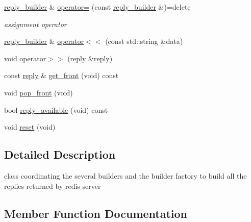 \begin{DoxyCompactItemize}
\mbox{\label{classcpp__redis_1_1builders_1_1reply__builder_a445ca388e241fe95b522890fee8c14ca}} 
\mbox{\hyperlink{classcpp__redis_1_1builders_1_1reply__builder}{reply\+\_\+builder}} \& \mbox{\hyperlink{classcpp__redis_1_1builders_1_1reply__builder_a445ca388e241fe95b522890fee8c14ca}{operator=}} (const \mbox{\hyperlink{classcpp__redis_1_1builders_1_1reply__builder}{reply\+\_\+builder}} \&)=delete
\begin{DoxyCompactList}\small\item\em assignment operator \end{DoxyCompactList}\item 
\mbox{\hyperlink{classcpp__redis_1_1builders_1_1reply__builder}{reply\+\_\+builder}} \& \mbox{\hyperlink{classcpp__redis_1_1builders_1_1reply__builder_a5f675e309a7a6002d582293c6410c967}{operator$<$$<$}} (const std\+::string \&data)
\item 
void \mbox{\hyperlink{classcpp__redis_1_1builders_1_1reply__builder_a71c0c93754b0bffb9c84c86ac3096bc4}{operator$>$$>$}} (\mbox{\hyperlink{classcpp__redis_1_1reply}{reply}} \&\mbox{\hyperlink{classcpp__redis_1_1reply}{reply}})
\item 
const \mbox{\hyperlink{classcpp__redis_1_1reply}{reply}} \& \mbox{\hyperlink{classcpp__redis_1_1builders_1_1reply__builder_ac37b532920ace20e24a40ea1c61940fe}{get\+\_\+front}} (void) const
\item 
void \mbox{\hyperlink{classcpp__redis_1_1builders_1_1reply__builder_a0b5fb8dd4fc87c508e0a45647bc86b16}{pop\+\_\+front}} (void)
\item 
bool \mbox{\hyperlink{classcpp__redis_1_1builders_1_1reply__builder_af7d8e764ab591390cd1eae8801cd691c}{reply\+\_\+available}} (void) const
\item 
void \mbox{\hyperlink{classcpp__redis_1_1builders_1_1reply__builder_a9dc120d8bdbe8992bb113f029a825c45}{reset}} (void)
\end{DoxyCompactItemize}


\subsection{Detailed Description}
class coordinating the several builders and the builder factory to build all the replies returned by redis server 

\subsection{Member Function Documentation}
\mbox{\label{classcpp__redis_1_1builders_1_1reply__builder_ac37b532920ace20e24a40ea1c61940fe}} 

